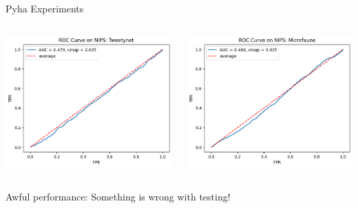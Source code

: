 \begin{frame}{Pyha Experiments}
    \begin{columns}
        \begin{column}{0.5\textwidth}
            \includegraphics[width=\textwidth]{images/pe_twt_nips_lenient.png}
        \end{column}
        \begin{column}{0.5\textwidth}
            \includegraphics[width=\textwidth]{images/pe_mf_nips_lenient.png}
        \end{column}
    \end{columns}
    Awful performance: Something is wrong with testing!
\end{frame}
